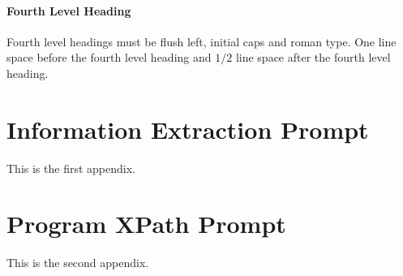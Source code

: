 \documentclass[a4paper]{article}
\begin{document}
\paragraph{Fourth Level Heading}

Fourth level headings must be flush left, initial caps and roman type.
One line space before the fourth level heading and $1/2$ line
space after the fourth level heading.

% 
{}


\appendix

\section{Information Extraction Prompt}
This is the first appendix.

\section{Program XPath Prompt}
This is the second appendix.
\end{document}
